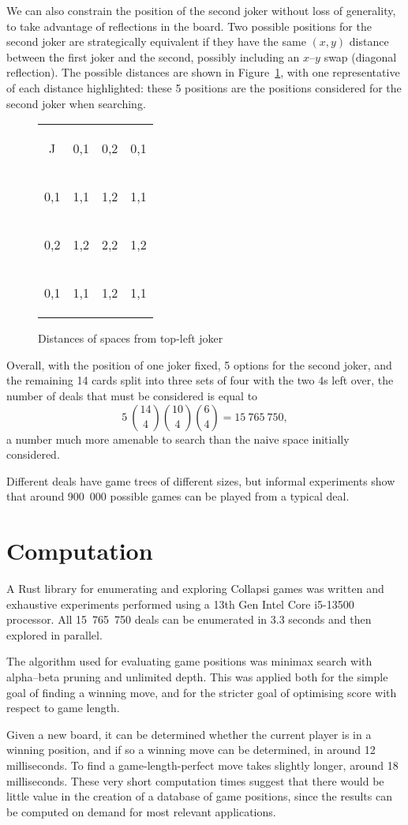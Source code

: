 \documentclass[a4paper, twocolumn]{article}
\newcommand\card[1]{\begin{tcolorbox}#1\end{tcolorbox}}
\newcommand\emphcard[1]{\begin{tcolorbox}[colback=red!30]#1\end{tcolorbox}}
\newcommand\customboard[8]{
  \setlength{\tabcolsep}{0.1cm}
  \begin{tabular}{c c c c}
    #1 & #2 & #3 & #4 \\
    #5 & #6 & #7 & #8 \\
    \customboardmore
}
\newcommand\customboardmore[8]{
    #1 & #2 & #3 & #4 \\
    #5 & #6 & #7 & #8
  \end{tabular}
}
\begin{document}
We can also constrain the position of the second joker without loss of
generality, to take advantage of reflections in the board. Two possible
positions for the second joker are strategically equivalent if they have the same $(x, y)$
distance between the first joker and the second,
possibly including an $x$--$y$ swap (diagonal reflection). The possible distances are shown in
Figure~\ref{fig:joker-distances}, with one representative of each distance
highlighted: these 5 positions are the positions considered for the second joker
when searching.

\begin{figure}[ht]
  \centering
  \customboard
  {\card{J}} {\emphcard{0,1}} {\emphcard{0,2}} {\card{0,1}}
  {\card{0,1}} {\emphcard{1,1}} {\emphcard{1,2}} {\card{1,1}}
  {\card{0,2}} {\card{1,2}} {\emphcard{2,2}} {\card{1,2}}
  {\card{0,1}} {\card{1,1}} {\card{1,2}} {\card{1,1}}
  \caption{Distances of spaces from top-left joker}
  \label{fig:joker-distances}
\end{figure}

Overall, with the position of one joker fixed, 5 options for the second joker,
and the remaining 14 cards split into three sets of four with the two 4s left
over, the number of deals that must be considered is equal to
$$5~\binom{14}{4} \binom{10}{4} \binom{6}{4} = 15~765~750,$$
a number much more amenable to search than the naive space initially considered.

Different deals have game trees of different sizes, but informal experiments
show that around 900~000 possible games can be played from a typical deal.


\section{Computation}

A Rust library for enumerating and exploring Collapsi games was written
\cite{github} and exhaustive experiments performed using a 13th Gen Intel Core
i5-13500 processor. All 15~765~750 deals can be enumerated in 3.3 seconds and
then explored in parallel.

The algorithm used for evaluating game positions was minimax search with
alpha--beta pruning and unlimited depth. This was applied both for the simple
goal of finding a winning move, and for the stricter goal of optimising score
with respect to game length.

Given a new board, it can be determined whether the current player is in a
winning position, and if so a winning move can be determined, in around 12
milliseconds. To find a game-length-perfect move takes slightly longer, around
18 milliseconds. These very
short computation times suggest that there would be little value in the creation
of a database of game positions, since the results can be computed on demand for
most relevant applications.
\end{document}
